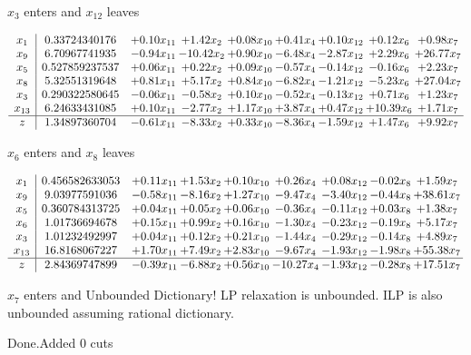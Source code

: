 \documentclass[8pt]{article}
\begin{document}
 $ x_{3} $ enters and $ x_{12} $ leaves 

 \[\begin{array}{c| c c@{\hskip 2pt} c@{\hskip 2pt} c@{\hskip 2pt} c@{\hskip 2pt} c@{\hskip 2pt} c@{\hskip 2pt} c@{\hskip 2pt} }
 x_{1}   &  0.33724340176 & +  0.10 x_{11} & +  1.42 x_{2} & +  0.08 x_{10} & +  0.41 x_{4} & +  0.10 x_{12} & +  0.12 x_{6} & +  0.98 x_{7}\\
 x_{9}   &  6.70967741935 & -0.94 x_{11} & -10.42 x_{2} & +  0.90 x_{10} & -6.48 x_{4} & -2.87 x_{12} & +  2.29 x_{6} & + 26.77 x_{7}\\
 x_{5}   &  0.527859237537 & +  0.06 x_{11} & +  0.22 x_{2} & +  0.09 x_{10} & -0.57 x_{4} & -0.14 x_{12} & -0.16 x_{6} & +  2.23 x_{7}\\
 x_{8}   &  5.32551319648 & +  0.81 x_{11} & +  5.17 x_{2} & +  0.84 x_{10} & -6.82 x_{4} & -1.21 x_{12} & -5.23 x_{6} & + 27.04 x_{7}\\
 x_{3}   &  0.290322580645 & -0.06 x_{11} & -0.58 x_{2} & +  0.10 x_{10} & -0.52 x_{4} & -0.13 x_{12} & +  0.71 x_{6} & +  1.23 x_{7}\\
 x_{13}   &  6.24633431085 & +  0.10 x_{11} & -2.77 x_{2} & +  1.17 x_{10} & +  3.87 x_{4} & +  0.47 x_{12} & + 10.39 x_{6} & +  1.71 x_{7}\\
\hline
z    &  1.34897360704 & -0.61 x_{11} & -8.33 x_{2} & +  0.33 x_{10} & -8.36 x_{4} & -1.59 x_{12} & +  1.47 x_{6} & +  9.92 x_{7}\\
\end{array}\]


 $ x_{6} $ enters and $ x_{8} $ leaves 

 \[\begin{array}{c| c c@{\hskip 2pt} c@{\hskip 2pt} c@{\hskip 2pt} c@{\hskip 2pt} c@{\hskip 2pt} c@{\hskip 2pt} c@{\hskip 2pt} }
 x_{1}   &  0.456582633053 & +  0.11 x_{11} & +  1.53 x_{2} & +  0.10 x_{10} & +  0.26 x_{4} & +  0.08 x_{12} & -0.02 x_{8} & +  1.59 x_{7}\\
 x_{9}   &  9.03977591036 & -0.58 x_{11} & -8.16 x_{2} & +  1.27 x_{10} & -9.47 x_{4} & -3.40 x_{12} & -0.44 x_{8} & + 38.61 x_{7}\\
 x_{5}   &  0.360784313725 & +  0.04 x_{11} & +  0.05 x_{2} & +  0.06 x_{10} & -0.36 x_{4} & -0.11 x_{12} & +  0.03 x_{8} & +  1.38 x_{7}\\
 x_{6}   &  1.01736694678 & +  0.15 x_{11} & +  0.99 x_{2} & +  0.16 x_{10} & -1.30 x_{4} & -0.23 x_{12} & -0.19 x_{8} & +  5.17 x_{7}\\
 x_{3}   &  1.01232492997 & +  0.04 x_{11} & +  0.12 x_{2} & +  0.21 x_{10} & -1.44 x_{4} & -0.29 x_{12} & -0.14 x_{8} & +  4.89 x_{7}\\
 x_{13}   &  16.8168067227 & +  1.70 x_{11} & +  7.49 x_{2} & +  2.83 x_{10} & -9.67 x_{4} & -1.93 x_{12} & -1.98 x_{8} & + 55.38 x_{7}\\
\hline
z    &  2.84369747899 & -0.39 x_{11} & -6.88 x_{2} & +  0.56 x_{10} & -10.27 x_{4} & -1.93 x_{12} & -0.28 x_{8} & + 17.51 x_{7}\\
\end{array}\]


 $ x_{7} $ enters and Unbounded Dictionary!
 LP relaxation is unbounded. ILP is also unbounded assuming rational dictionary. 

Done.Added 0 cuts 
\end{document}
